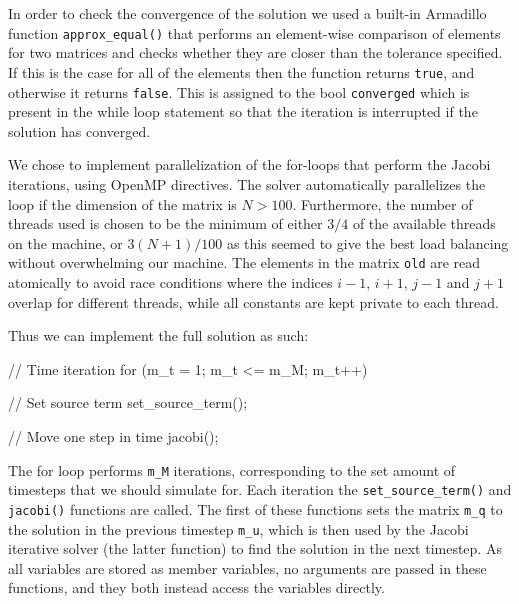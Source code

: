 \documentclass[reprint,english,notitlepage]{revtex4-1}  %
\begin{document}
In order to check the convergence of the solution we used a built-in Armadillo function \verb+approx_equal()+ that performs an element-wise comparison of elements for two matrices and checks whether they are closer than the tolerance specified. If this is the case for all of the elements then the function returns \verb+true+, and otherwise it returns \verb+false+. This is assigned to the bool \verb+converged+ which is present in the while loop statement so that the iteration is interrupted if the solution has converged.

We chose to implement parallelization of the for-loops that perform the Jacobi iterations, using OpenMP directives. The solver automatically parallelizes the loop if the dimension of the matrix is \(N > 100\). Furthermore, the number of threads used is chosen to be the minimum of either \(3/4\) of the available threads on the machine, or \(3(N+1)/100\) as this seemed to give the best load balancing without overwhelming our machine. The elements in the matrix \verb+old+ are read atomically to avoid race conditions where the indices \(i-1\), \(i+1\), \(j-1\) and \(j+1\) overlap for different threads, while all constants are kept private to each thread.


Thus we can implement the full solution as such:

\begin{cpp}
// Time iteration
for (m_t = 1; m_t <= m_M; m_t++){
  // Set source term
  set_source_term();

  // Move one step in time
  jacobi();
}
\end{cpp}

The for loop performs \verb+m_M+ iterations, corresponding to the set amount of timesteps that we should simulate for. Each iteration the \verb+set_source_term()+ and \verb+jacobi()+ functions are called. The first of these functions sets the matrix \verb+m_q+ to the solution in the previous timestep \verb+m_u+, which is then used by the Jacobi iterative solver (the latter function) to find the solution in the next timestep. As all variables are stored as member variables, no arguments are passed in these functions, and they both instead access the variables directly. 
\end{document}
